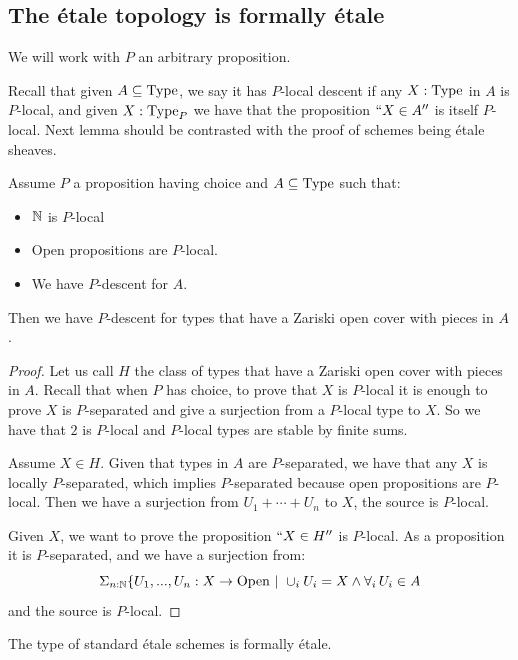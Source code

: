 \subsection{The \'etale topology is formally \'etale}

We will work with $P$ an arbitrary proposition.

Recall that given $A\subseteq \mathrm{Type}$, we say it has $P$-local descent if any $X:\mathrm{Type}$ in $A$ is $P$-local, and given $X:\mathrm{Type}_P$ we have that the proposition $``X\in A''$ is itself $P$-local. Next lemma should be contrasted with the proof of schemes being \'etale sheaves. 

\begin{lemma}\label{descent-for-gluing}
Assume $P$ a proposition having choice and $A\subseteq \mathrm{Type}$ such that:
\begin{itemize}
\item $\mathbb{N}$ is $P$-local
\item Open propositions are $P$-local.
\item We have $P$-descent for $A$.
\end{itemize}

Then we have $P$-descent for types that have a Zariski open cover with pieces in $A$.
\end{lemma}

\begin{proof}
Let us call $H$ the class of types that have a Zariski open cover with pieces in $A$. Recall that when $P$ has choice, to prove that $X$ is $P$-local it is enough to prove $X$ is $P$-separated and give a surjection from a $P$-local type to $X$. So we have that $2$ is $P$-local and $P$-local types are stable by finite sums.

Assume $X\in H$. Given that types in $A$ are $P$-separated, we have that any $X$ is locally $P$-separated, which implies $P$-separated because open propositions are $P$-local. Then we have a surjection from $U_1+\cdots +U_n$ to $X$, the source is $P$-local.

Given $X$, we want to prove the proposition $``X\in H''$ is $P$-local. As a proposition it is $P$-separated, and we have a surjection from:
\[\Sigma_{n:\N} \{U_1,...,U_n:X\to \mathrm{Open}\ |\ \cup_iU_i = X \land \forall_i\, U_i\in A\]
and the source is $P$-local.
\end{proof}

\begin{lemma}\label{descent-standard-etale}
The type of standard \'etale schemes is formally \'etale.
\end{lemma}

